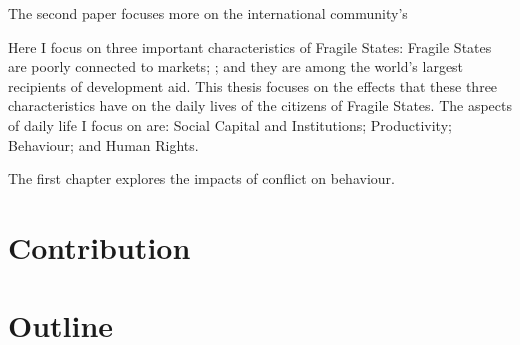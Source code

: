 The second paper focuses more on the international community's 
%


Here I focus on three important characteristics of Fragile States: Fragile States are poorly connected to markets; ; and they are among the world's largest recipients of development aid. This thesis focuses on the effects that these three characteristics have on the daily lives of the citizens of Fragile States. The aspects of daily life I focus on are: Social Capital and Institutions; Productivity; Behaviour; and Human Rights.

The first chapter explores the impacts of conflict on behaviour. 



\section{Contribution}


\section{Outline}


\clearpage 

